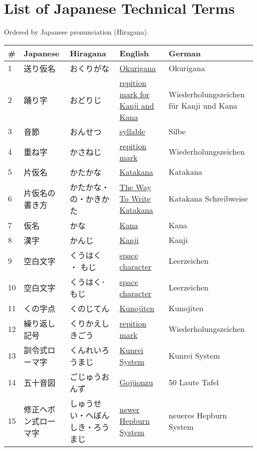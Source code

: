 \chapter{List of Japanese Technical Terms}
\label{chap:ListOfJapaneseTechnicalTerms}
\label{sec:JapaneseTechnicalTerms}
\normalsize Ordered by Japanese pronunciation (Hiragana).
\footnotesize\Padding
\begin{longtable}[c]{p{.5cm}p{3.5cm}p{4cm}p{3.5cm}p{3.5cm}}
\textbf{\#}&\textbf{Japanese}&\textbf{Hiragana}&\textbf{English}&\textbf{German}\\ \hline
1&送り仮名&おくりがな&\hyperref[sec:Okurigana]{Okurigana}&Okurigana\\
2&踊り字&おどりじ&\hyperref[sec:RepitionMarkForKanjiAndKana]{repition mark for Kanji and Kana}&Wiederholungszeichen für Kanji und Kana\\
3&音節&おんせつ&\hyperref[sec:Syllable]{syllable}&Silbe\\
4&重ね字&かさねじ&\hyperref[sec:RepitionMark]{repition mark}&Wiederholungszeichen\\
5&片仮名&かたかな&\hyperref[sec:Katakana]{Katakana}&Katakana\\
6&片仮名の書き方&かたかな・の・かきかた&\hyperref[sec:TheWayToWriteKatakana]{The Way To Write Katakana}&Katakana Schreibweise\\
7&仮名&かな&\hyperref[sec:Kana]{Kana}&Kana\\
8&漢字&かんじ&\hyperref[sec:Kanji]{Kanji}&Kanji\\
9&空白文字&くうはく ・ もじ&\hyperref[sec:SpaceCharacter]{space character}&Leerzeichen\\
10&空白文字&くうはく･もじ&\hyperref[sec:SpaceCharacter]{space character}&Leerzeichen\\
11&くの字点&くのじてん&\hyperref[sec:Kunojiten]{Kunojiten}&Kunojiten\\
12&繰り返し記号&くりかえしきごう&\hyperref[sec:RepitionMark]{repition mark}&Wiederholungszeichen\\
13&訓令式ローマ字&くんれいろうまじ&\hyperref[sec:KunreiSystem]{Kunrei System}&Kunrei System\\
14&五十音図&ごじゅうおんず&\hyperref[sec:Gojuonzu]{Gojūonzu}&50 Laute Tafel\\
15&修正ヘボン式ローマ字&しゅうせい・へぼんしき・ろうまじ&\hyperref[sec:NewerHepburnSystem]{newer Hepburn System}&neueres Hepburn System\\

\end{longtable}
